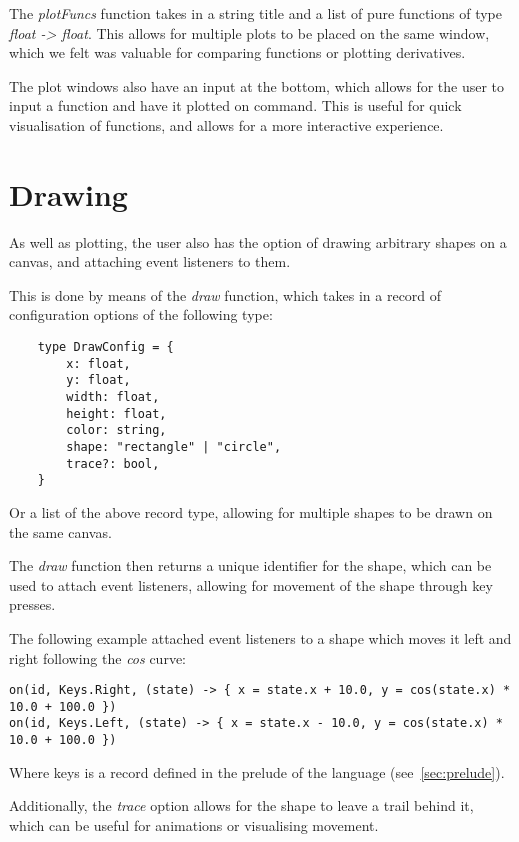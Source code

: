 
The \textit{plotFuncs} function takes in a string title and a list of pure functions of type \textit{float -> float}.
This allows for multiple plots to be placed on the same window, which we felt was valuable for comparing functions 
or plotting derivatives.

The plot windows also have an input at the bottom, which allows for the user to input a function and have it plotted
on command.
This is useful for quick visualisation of functions, and allows for a more interactive experience.

\section{Drawing}\label{sec:drawing}

As well as plotting, the user also has the option of drawing arbitrary shapes on a canvas, and attaching event 
listeners to them.

This is done by means of the \textit{draw} function, which takes in a record of configuration options of the following
type:

\begin{verbatim}
    type DrawConfig = {
        x: float,
        y: float,
        width: float,
        height: float,
        color: string,
        shape: "rectangle" | "circle",
        trace?: bool, 
    }
\end{verbatim}

Or a list of the above record type, allowing for multiple shapes to be drawn on the same canvas.

The \textit{draw} function then returns a unique identifier for the shape, which can be used to attach event 
listeners, allowing for movement of the shape through key presses.

The following example attached event listeners to a shape which moves it left and right following the \textit{cos} curve:

\begin{verbatim}
on(id, Keys.Right, (state) -> { x = state.x + 10.0, y = cos(state.x) * 10.0 + 100.0 })
on(id, Keys.Left, (state) -> { x = state.x - 10.0, y = cos(state.x) * 10.0 + 100.0 })
\end{verbatim}

Where keys is a record defined in the prelude of the language (see~\autoref{sec:prelude}).

Additionally, the \textit{trace} option allows for the shape to leave a trail behind it, which can be useful for
animations or visualising movement.

